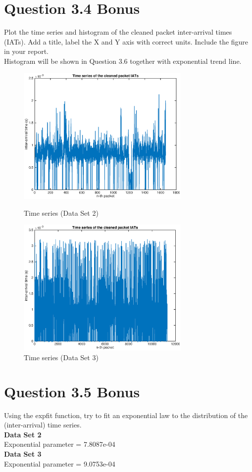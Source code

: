 \documentclass{article}
\newenvironment{homeworkProblem}[1]{
	\section*{#1}
	}{
}
\begin{document}
\begin{homeworkProblem}{Question 3.4 Bonus}
Plot the time series and histogram of the cleaned packet inter-arrival times (IATs). Add a title, label the X and Y axis with correct units. Include the figure in your report.\\

Histogram will be shown in Question 3.6 together with exponential trend line.

\begin{figure}[H]
\begin{minipage}[t]{0.5\linewidth}
\centering
\includegraphics[width=3.3in]{img/time-series2.eps}
\caption{Time series (Data Set 2)}
\end{minipage}
\begin{minipage}[t]{0.5\linewidth}
\centering
\includegraphics[width=3.3in]{img/time-series3.eps}
\caption{Time series (Data Set 3)}
\end{minipage}
\end{figure}

\end{homeworkProblem}

\begin{homeworkProblem}{Question 3.5 Bonus}
Using the expfit function, try to fit an exponential law to the distribution of the (inter-arrival) time series.\\

\textbf{Data Set 2}\\
Exponential parameter = 7.8087e-04\\

\textbf{Data Set 3}\\
Exponential parameter = 9.0753e-04
\end{homeworkProblem}
\end{document}
